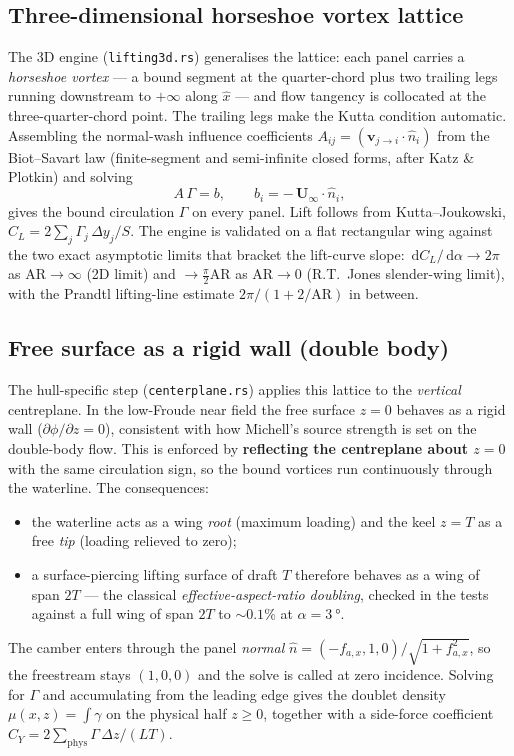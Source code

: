 \documentclass[11pt]{article}
\newcommand{\dd}{\,\mathrm{d}}
\begin{document}
\subsection{Three-dimensional horseshoe vortex lattice}
\label{sec:3d}

The 3D engine (\texttt{lifting3d.rs}) generalises the lattice: each panel carries
a \emph{horseshoe vortex} --- a bound segment at the quarter-chord plus two
trailing legs running downstream to $+\infty$ along $\hat{x}$ --- and flow
tangency is collocated at the three-quarter-chord point. The trailing legs make
the Kutta condition automatic. Assembling the normal-wash influence
coefficients $A_{ij} = (\mathbf{v}_{j\to i}\cdot\hat{n}_i)$ from the
Biot--Savart law (finite-segment and semi-infinite closed forms, after Katz \&
Plotkin) and solving
\begin{equation}
  A\,\Gamma = b, \qquad b_i = -\,\mathbf{U}_\infty\cdot\hat{n}_i,
\end{equation}
gives the bound circulation $\Gamma$ on every panel. Lift follows from
Kutta--Joukowski, $C_L = 2\sum_j \Gamma_j\,\Delta y_j / S$. The engine is
validated on a flat rectangular wing against the two exact asymptotic limits
that bracket the lift-curve slope: $\dd C_L/\dd\alpha\to 2\pi$ as
$\mathrm{AR}\to\infty$ (2D limit) and $\to \tfrac{\pi}{2}\mathrm{AR}$ as
$\mathrm{AR}\to 0$ (R.T.\ Jones slender-wing limit), with the Prandtl
lifting-line estimate $2\pi/(1+2/\mathrm{AR})$ in between.

\subsection{Free surface as a rigid wall (double body)}
\label{sec:doublebody}

The hull-specific step (\texttt{centerplane.rs}) applies this lattice to the
\emph{vertical} centreplane. In the low-Froude near field the free surface
$z=0$ behaves as a rigid wall ($\partial\phi/\partial z = 0$), consistent with
how Michell's source strength is set on the double-body flow. This is enforced
by \textbf{reflecting the centreplane about $z=0$} with the same circulation
sign, so the bound vortices run continuously through the waterline. The
consequences:
\begin{itemize}
  \item the waterline acts as a wing \emph{root} (maximum loading) and the keel
        $z=T$ as a free \emph{tip} (loading relieved to zero);
  \item a surface-piercing lifting surface of draft $T$ therefore behaves as a
        wing of span $2T$ --- the classical \emph{effective-aspect-ratio
        doubling}, checked in the tests against a full wing of span $2T$ to
        $\sim0.1\%$ at $\alpha = \SI{3}{\degree}$.
\end{itemize}
The camber enters through the panel \emph{normal}
$\hat{n} = (-f_{a,x}, 1, 0)/\sqrt{1 + f_{a,x}^2}$, so the freestream stays
$(1,0,0)$ and the solve is called at zero incidence. Solving for $\Gamma$ and
accumulating from the leading edge gives the doublet density
$\mu(x,z) = \int\gamma$ on the physical half $z\ge 0$, together with a
side-force coefficient $C_Y = 2\sum_{\mathrm{phys}}\Gamma\,\Delta z/(LT)$.
\end{document}
